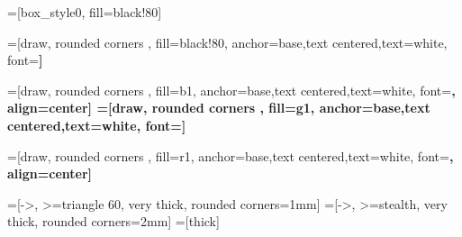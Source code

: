=[box_style0, fill=black!80] %

=[draw, rounded corners , fill=black!80,
anchor=base,text centered,text=white, font=\bfseries] %

=[draw, rounded corners , fill=b1,
anchor=base,text centered,text=white, font=\bfseries, align=center] %
=[draw, rounded corners , fill=g1,
anchor=base,text centered,text=white, font=\bfseries] %

=[draw, rounded corners , fill=r1,
anchor=base,text centered,text=white, font=\bfseries, align=center] %

=[->, >=triangle 60, very thick, rounded corners=1mm]
=[->, >=stealth, very thick, rounded corners=2mm]
=[thick]





\usepackage[cm]{sfmath}
\renewcommand\dot[1]{\text{\stackon[1pt]{$#1$}{.}}}



\beamertemplatenavigationsymbolsempty

\newcommand{\RightCrlBrc}[1]{$\pmb{\left. \rule{0pt}{#1}\right\}} $}

\newcommand{\TextSoulign}[3]{\textcolor{#1}{\underline{#2\textcolor{black}{#3}}}}
\newcommand\dgs[0]{$^\circ$}
\newcommand\dgsC[0]{$\,^{\circ}{\rm C}$}

\newcommand\up[1]{$^{\text{#1}}$}
\newcommand*\dif{\mathop{}\!\textnormal{\slshape d}}


\newcommand\tbf[1]{\textbf{#1}}
\newcommand\tit[1]{\textit{#1}}
\newcommand\tcit[2]{\textcolor{#1}{\textit{#2}}}

\newcommand{\chckmrk}[0]{\Large \textcolor{mygreen}{\checkmark}}

